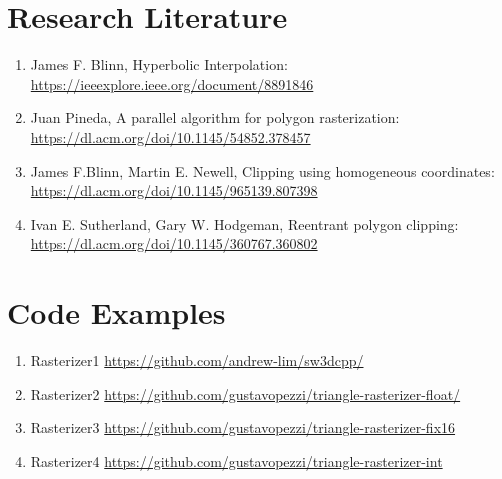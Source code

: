 \section{Research Literature}
\begin{enumerate}
    \item James F. Blinn, Hyperbolic Interpolation: \url{https://ieeexplore.ieee.org/document/8891846}
     \item Juan Pineda, A parallel algorithm for polygon rasterization: \url{https://dl.acm.org/doi/10.1145/54852.378457}
      \item James F.Blinn, Martin E. Newell,  Clipping using homogeneous coordinates: \url{https://dl.acm.org/doi/10.1145/965139.807398}
      \item Ivan E. Sutherland, Gary W. Hodgeman, Reentrant polygon clipping: \url{https://dl.acm.org/doi/10.1145/360767.360802}
\end{enumerate}

\section{Code Examples}
\begin{enumerate}
    \item Rasterizer1 \url{https://github.com/andrew-lim/sw3dcpp/}
    \item Rasterizer2 \url{https://github.com/gustavopezzi/triangle-rasterizer-float/}
    \item Rasterizer3 \url{https://github.com/gustavopezzi/triangle-rasterizer-fix16}
    \item Rasterizer4 \url{https://github.com/gustavopezzi/triangle-rasterizer-int}
\end{enumerate}
\clearpage